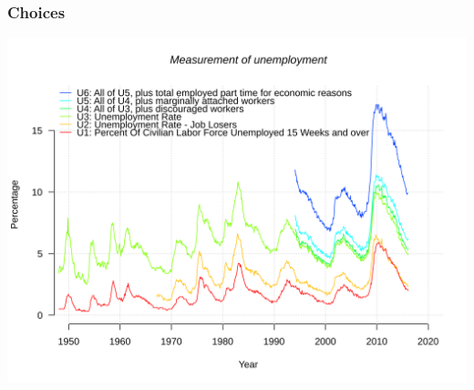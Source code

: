 \documentclass[aspectratio=169]{beamer}
\theoremstyle{principle}
\begin{document}
%


\begin{frame}
\frametitle{Choices}
\begin{center}
\includegraphics[scale=0.15]{unemployment_2.png}
\end{center}

\end{frame}
\end{document}
